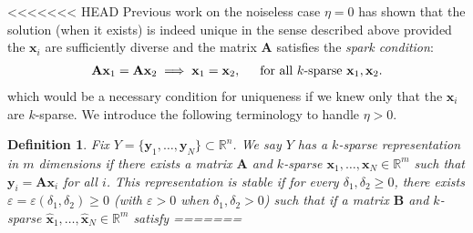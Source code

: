\documentclass[9pt,twocolumn]{pnas-new}
\newtheorem{definition}{Definition}
\begin{document}
<<<<<<< HEAD
Previous work \cite{li2004analysis, Georgiev05, Aharon06, Hillar15} on the noiseless case $\eta = 0$ has shown that the solution (when it exists) is indeed unique in the sense described above provided the $\mathbf{x}_i$ are sufficiently diverse and the matrix $\mathbf{A}$ satisfies the \textit{spark condition}:
\begin{align}\label{SparkCondition}
\mathbf{A}\mathbf{x}_1 = \mathbf{A}\mathbf{x}_2 \implies \mathbf{x}_1 = \mathbf{x}_2,\indent \text{for all $k$-sparse } \mathbf{x}_1, \mathbf{x}_2.
\end{align}
%
which would be a necessary condition for uniqueness if we knew only that the $\mathbf{x}_i$ are $k$-sparse. We introduce the following terminology to handle $\eta > 0$. 
\begin{definition}
Fix $Y = \{ \mathbf{y}_1, \ldots, \mathbf{y}_N\} \subset \mathbb{R}^n$. We say $Y$ has a \emph{$k$-sparse representation in $m$ dimensions} if there exists a matrix $\mathbf{A}$ and $k$-sparse $\mathbf{x}_1, \ldots, \mathbf{x}_N \in \mathbb{R}^m$ such that $\mathbf{y}_i = \mathbf{A}\mathbf{x}_i$ for all $i$. %
This representation is \emph{stable} if for every $\delta_1, \delta_2 \geq 0$, there exists $\varepsilon = \varepsilon(\delta_1, \delta_2) \geq 0$ (with $\varepsilon > 0$ when  $\delta_1, \delta_2 > 0$) such that if a matrix $\mathbf{B}$ and $k$-sparse $\mathbf{\hat x}_1, \ldots, \mathbf{\hat x}_N \in \mathbb{R}^m$ satisfy
=======







 

\end{definition}
\end{document}
